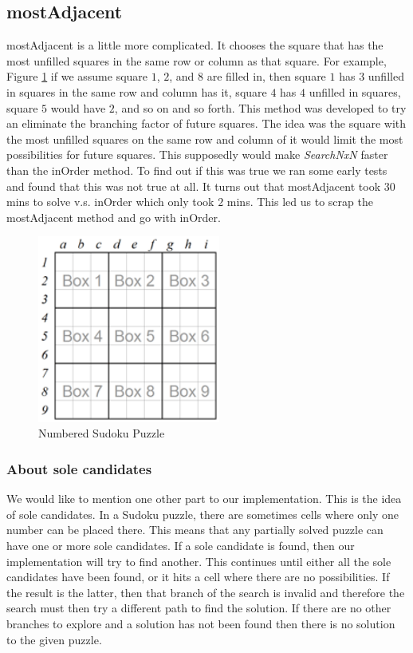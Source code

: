 \documentclass[letterpaper]{article}
\begin{document}
\subsection{mostAdjacent}
mostAdjacent is a little more complicated. It chooses the square that has the most unfilled squares in the same row or column as that square. For example, Figure \ref{fig:num-sudoku-puzzle} if we assume square $1$, $2$, and $8$ are filled in, then square $1$ has $3$ unfilled in squares in the same row and column has it, square $4$ has $4$ unfilled in squares, square $5$ would have $2$, and so on and so forth. This method was developed to try an eliminate the branching factor of future squares. The idea was the square with the most unfilled squares on the same row and column of it would limit the most possibilities for future squares. This supposedly would make \emph{SearchNxN} faster than the inOrder method. To find out if this was true we ran some early tests and found that this was not true at all. It turns out that mostAdjacent took $30$ mins to solve v.s. inOrder which only took $2$ mins. This led us to scrap the mostAdjacent method and go with inOrder.

\begin{figure}[h]
	\centering
	\includegraphics[width=60mm]{./numBox.png}
	\caption{Numbered Sudoku Puzzle}
	\label{fig:num-sudoku-puzzle}
\end{figure}

\subsubsection{About sole candidates}
We would like to mention one other part to our implementation. This is the idea of sole candidates. In a Sudoku puzzle, there are sometimes cells where only one number can be placed there. This means that any partially solved puzzle can have one or more sole candidates. If a sole candidate is found, then our implementation will try to find another. This continues until either all the sole candidates have been found, or it hits a cell where there are no possibilities. If the result is the latter, then that branch of the search is invalid and therefore the search must then try a different path to find the solution. If there are no other branches to explore and a solution has not been found then there is no solution to the given puzzle.
\end{document}
